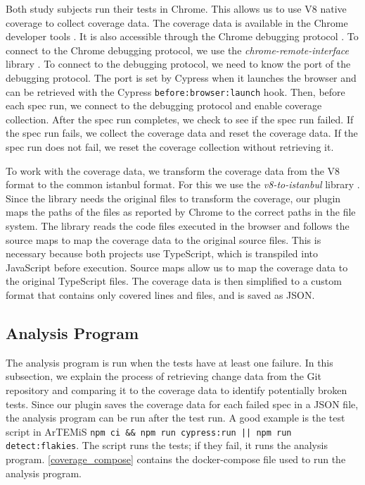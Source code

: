 Both study subjects run their tests in Chrome.
This allows us to use V8 native coverage to collect coverage data.
The coverage data is available in the Chrome developer tools \autocite{basques_coverage_2020}.
It is also accessible through the Chrome debugging protocol \autocite{noauthor_chrome_nodate}.
To connect to the Chrome debugging protocol, we use the \emph{chrome-remote-interface} library \autocite{cardaci_chrome-remote-interface_2023}.
To connect to the debugging protocol, we need to know the port of the debugging protocol.
The port is set by Cypress when it launches the browser and can be retrieved with the Cypress \texttt{before:browser:launch} hook.
Then, before each spec run, we connect to the debugging protocol and enable coverage collection.
After the spec run completes, we check to see if the spec run failed.
If the spec run fails, we collect the coverage data and reset the coverage data.
If the spec run does not fail, we reset the coverage collection without retrieving it.

To work with the coverage data, we transform the coverage data from the V8 format to the common istanbul format.
For this we use the \emph{v8-to-istanbul} library \autocite{noauthor_v8--istanbul_2023}.
Since the library needs the original files to transform the coverage, our plugin maps the paths of the files as reported by Chrome to the correct paths in the file system.
The library reads the code files executed in the browser and follows the source maps to map the coverage data to the original source files.
This is necessary because both projects use TypeScript, which is transpiled into JavaScript before execution.
Source maps allow us to map the coverage data to the original TypeScript files.
The coverage data is then simplified to a custom format that contains only covered lines and files, and is saved as JSON.

\subsection{Analysis Program}
The analysis program is run when the tests have at least one failure.
In this subsection, we explain the process of retrieving change data from the Git repository and comparing it to the coverage data to identify potentially broken tests.
Since our plugin saves the coverage data for each failed spec in a JSON file, the analysis program can be run after the test run.
A good example is the test script in ArTEMiS \texttt{npm ci \&\& npm run cypress:run || npm run detect:flakies}. The script runs the tests; if they fail, it runs the analysis program.
\cref{coverage_compose} contains the docker-compose file used to run the analysis program.

